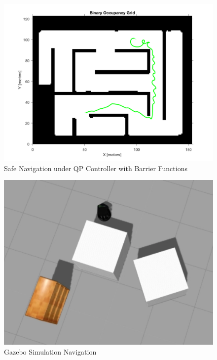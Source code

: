 \documentclass[conference]{IEEEtran}
\begin{document}
\begin{figure}[h!]
\centering
\includegraphics[scale=0.18]{thick_plot.png} 
\caption{Safe Navigation under QP Controller with Barrier Functions\label{fig:prm_works}}
\end{figure}

\begin{figure}[h!]
\centering
\includegraphics[scale=0.3]{Gazebo_exp.png} 
\caption{Gazebo Simulation Navigation\label{fig:gazebo}}
\end{figure}
\end{document}

